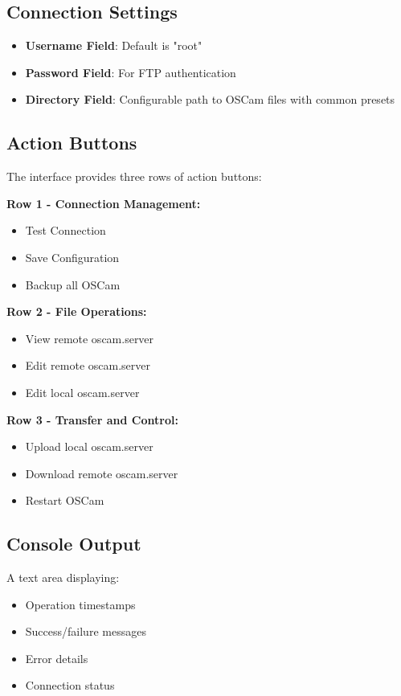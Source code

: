 \documentclass[a4paper,11pt]{report}
\begin{document}
\subsection{Connection Settings}
\begin{itemize}
    \item \textbf{Username Field}: Default is "root"
    \item \textbf{Password Field}: For FTP authentication
    \item \textbf{Directory Field}: Configurable path to OSCam files with common presets
\end{itemize}

\subsection{Action Buttons}
The interface provides three rows of action buttons:

\textbf{Row 1 - Connection Management:}
\begin{itemize}
    \item Test Connection
    \item Save Configuration
    \item Backup all OSCam
\end{itemize}

\textbf{Row 2 - File Operations:}
\begin{itemize}
    \item View remote oscam.server
    \item Edit remote oscam.server
    \item Edit local oscam.server
\end{itemize}

\textbf{Row 3 - Transfer and Control:}
\begin{itemize}
    \item Upload local oscam.server
    \item Download remote oscam.server
    \item Restart OSCam
\end{itemize}

\subsection{Console Output}
A text area displaying:
\begin{itemize}
    \item Operation timestamps
    \item Success/failure messages
    \item Error details
    \item Connection status
\end{itemize}
\end{document}
